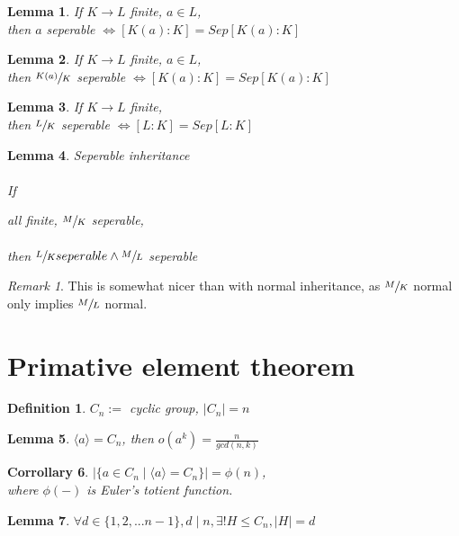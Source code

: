 \documentclass{article}
\theoremstyle{definitionstyle}
\newtheorem{defn}{Definition}[section]
\theoremstyle{lemmastyle}
\newtheorem{lem}{Lemma}[section]
\newtheorem{cor}[lem]{Corrollary}
\theoremstyle{remark}
\newtheorem*{remark}{Remark}
\begin{document}
\begin{lem} If $K \to L$ finite, $a \in L$,\\

then $a$ seperable $\iff [K(a) : K] = Sep[K(a) :K]$\end{lem}

\begin{lem} If $K \to L$ finite, $a \in L$,\\

then $\sfrac{K(a)}{K}$ seperable $\iff [K(a) : K] = Sep[K(a) :K]$\end{lem}

\begin{lem}  If $K \to L$ finite,\\

then $\sfrac{L}{K}$ seperable $\iff [L: K] = Sep[L:K]$ \end{lem}

\begin{lem} Seperable inheritance\\
\\
If  all finite, $\sfrac{M}{K}$ seperable,\\
\\
then $\sfrac{L}{K} seperable \land \sfrac{M}{L}$ seperable \end{lem}
\begin{remark} This is somewhat nicer than with normal inheritance, as $\sfrac{M}{K}$ normal only implies $\sfrac{M}{L}$ normal.\end{remark} 
\section{Primative element theorem}
\begin{defn} $C_n :=$ cyclic group, $|C_n|= n$ \end{defn}
\begin{lem} $\langle a \rangle = C_n$, then $o(a^k) = \frac{n}{gcd(n,k)}$ \end{lem}
\begin{cor} $| \{a \in C_n \mid \langle a \rangle = C_n \}| = \phi(n)$, \\

where $\phi(-)$ is Euler's totient function. \end{cor}
\begin{lem} $\forall d \in \{1, 2, ... n - 1\}, d \mid n, \exists ! H \le C_n, |H| = d$ \end{lem}
\end{document}
